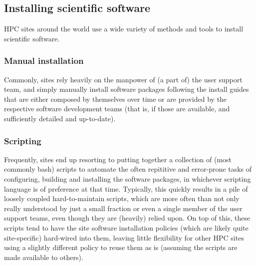 %
%


\subsection{Installing scientific software}
\label{sec:installing}

HPC sites around the world use a wide variety of methods and tools to
install scientific software.

\subsubsection{Manual installation}

Commonly, sites rely heavily on the manpower of (a part of)
the user support team, and simply manually install software packages following
the install guides that are either composed by themselves over time or are provided
by the respective software development teams (that is, if those are available, and
sufficiently detailed and up-to-date).

\subsubsection{Scripting}

Frequently, sites end up resorting to putting together a collection of (most
commonly bash) scripts to automate the often repititive and error-prone tasks of
configuring, building and installing the software packages, in whichever scripting
language is of preference at that time. Typically, this quickly results in a pile of
loosely coupled hard-to-maintain scripts, which are more often than not only really
understood by just a small fraction or even a single member of the user support
teams, even though they are (heavily) relied upon.
On top of this, these scripts
tend to have the site software installation policies (which are likely quite
site-specific) hard-wired into them, leaving little flexibility for other HPC
sites using a slightly different policy to reuse them as is (assuming the scripts
are made available to others).

